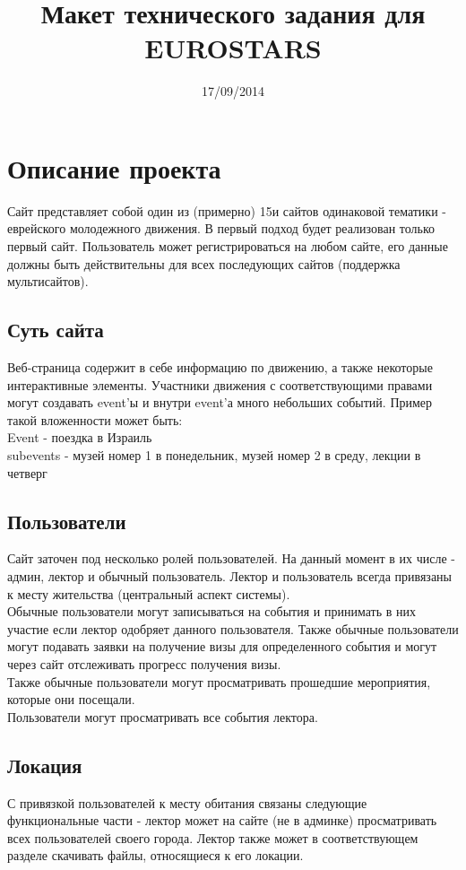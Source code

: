 \documentclass[DIV=calc, paper=a4, fontsize=11pt]{scrartcl} %
\title{Макет технического задания для EUROSTARS}
\date{17/09/2014}
\begin{document}
\maketitle

\section{Описание проекта}
Сайт представляет собой один из (примерно) 15и сайтов одинаковой тематики - еврейского молодежного движения. В первый подход будет реализован только первый сайт. Пользователь может регистрироваться на любом сайте, его данные должны быть действительны для всех последующих сайтов (поддержка мультисайтов).
\subsection{Суть сайта}
Веб-страница содержит в себе информацию по движению, а также некоторые интерактивные элементы. Участники движения с соответствующими правами могут создавать event'ы и внутри event'а много небольших событий. Пример такой вложенности может быть:
\\ Event - поездка в Израиль
\\ subevents - музей номер 1 в понедельник, музей номер 2 в среду, лекции в четверг
\subsection{Пользователи}
Сайт заточен под несколько ролей пользователей. На данный момент в их числе - админ, лектор и обычный пользователь. Лектор и пользователь всегда привязаны к месту жительства (центральный аспект системы).
\\[0.5cm]
Обычные пользователи могут записываться на события и принимать в них участие если лектор одобряет данного пользователя. Также обычные пользователи могут подавать заявки на получение визы для определенного события и могут через сайт отслеживать прогресс получения визы.
\\[0.5cm]
Также обычные пользователи могут просматривать прошедшие мероприятия, которые они посещали.
\\[0.5cm]
Пользователи могут просматривать все события лектора.
\subsection{Локация}
С привязкой пользователей к месту обитания связаны следующие функциональные части - лектор может на сайте (не в админке) просматривать всех пользователей своего города. Лектор также может в соответствующем разделе скачивать файлы, относящиеся к его локации.
\end{document}
